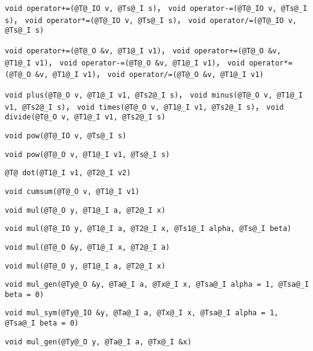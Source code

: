 \verb|void operator+=(@T@_IO v, @Ts@_I s)|， \verb|void operator-=(@T@_IO v, @Ts@_I s)|， \verb|void operator*=(@T@_IO v, @Ts@_I s)|， \verb|void operator/=(@T@_IO v, @Ts@_I s)|

\verb|void operator+=(@T@_O &v, @T1@_I v1)|， \verb|void operator+=(@T@_O &v, @T1@_I v1)|， \verb|void operator-=(@T@_O &v, @T1@_I v1)|， \verb|void operator*=(@T@_O &v, @T1@_I v1)|， \verb|void operator/=(@T@_O &v, @T1@_I v1)|

\verb|void plus(@T@_O v, @T1@_I v1, @Ts2@_I s)|， \verb|void minus(@T@_O v, @T1@_I v1, @Ts2@_I s)|， \verb|void times(@T@_O v, @T1@_I v1, @Ts2@_I s)|， \verb|void divide(@T@_O v, @T1@_I v1, @Ts2@_I s)|

\verb|void pow(@T@_IO v, @Ts@_I s)|

\verb|void pow(@T@_O v, @T1@_I v1, @Ts@_I s)|

\verb|@T@ dot(@T1@_I v1, @T2@_I v2)|

\verb|void cumsum(@T@_O v, @T1@_I v1)|

\verb|void mul(@T@_O y, @T1@_I a, @T2@_I x)|

\verb|void mul(@T@_IO y, @T1@_I a, @T2@_I x, @Ts1@_I alpha, @Ts@_I beta)|

\verb|void mul(@T@_O &y, @T1@_I x, @T2@_I a)|

\verb|void mul(@T@_O y, @T1@_I a, @T2@_I x)|

\verb|void mul_gen(@Ty@_O &y, @Ta@_I a, @Tx@_I x, @Tsa@_I alpha = 1, @Tsa@_I beta = 0)|

\verb|void mul_sym(@Ty@_IO &y, @Ta@_I a, @Tx@_I x, @Tsa@_I alpha = 1, @Tsa@_I beta = 0)|

\verb|void mul_gen(@Ty@_O y, @Ta@_I a, @Tx@_I &x)|

\

